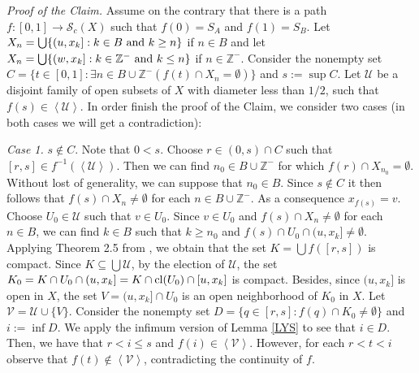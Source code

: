 \documentclass[11pt]{amsart}
\numberwithin{equation}{section}
\theoremstyle{plain}
\theoremstyle{definition}
\theoremstyle{definition}
\theoremstyle{definition}
\theoremstyle{definition}
\theoremstyle{definition}
\begin{document}
\textit{Proof of the Claim.} Assume on the contrary that there is a path $f : [0,1] \to \mathcal{S}_c(X)$ such that $f(0) = S_A$ and $f(1) = S_B$. Let $X_n = \bigcup\{(u,x_k] : k \in B \textnormal{ and } k \geq n\}$ if $n \in B$ and let $X_n = \bigcup\{(w,x_k] : k \in {\mathbb{Z}^-} \textnormal{ and } k \leq n\}$ if $n \in {\mathbb{Z}^-}$. Consider the nonempty set $C = \{t \in [0,1] : \exists n \in B \cup {\mathbb{Z}^-}(f(t) \cap X_n = \emptyset)\}$ and  $s := \sup C$. Let $\mathcal{U}$ be a disjoint family of open subsets of $X$ with diameter less than $1/2$, such that $f(s) \in \left\langle \mathcal{U}\right\rangle$. In order finish the proof of the Claim, we consider two cases (in both cases we will get a contradiction):

\smallskip

\textit{Case 1.} $s \not\in C$. Note that $0 < s$. Choose $r \in (0,s) \cap C$ such that $[r,s] \in f^{-1}(\left\langle \mathcal{U}\right\rangle)$. Then we can find $n_0 \in B \cup {\mathbb{Z}^-}$ for which  $f(r) \cap X_{n_0} = \emptyset$. Without lost of generality, we can suppose that $n_0 \in B$.  Since $s \not\in C$ it then follows  that $f(s) \cap X_n \not= \emptyset$ for each $n \in B \cup {\mathbb{Z}^-}$. As a consequence $x_{f(s)} = v$. Choose $U_0 \in \mathcal{U}$ such that $v \in U_0$. Since $v \in U_0$ and $f(s) \cap X_n \not= \emptyset$ for each $n \in B$, we can find $k \in B$ such that $k \geq n_0$ and $f(s) \cap U_0 \cap (u,x_k] \not= \emptyset$. Applying Theorem 2.5 from \cite{emi}, we obtain that the set $K = \bigcup f([r,s])$ is compact. Since $K \subseteq \bigcup \mathcal{U}$, by the election of $\mathcal{U}$, the set $K_0 = K \cap U_0 \cap (u,x_k] = K \cap \textnormal{cl}(U_0) \cap [u,x_k]$ is compact. Besides, since $(u,x_k]$ is open in $X$, the set $V = (u,x_k] \cap U_0$ is an open neighborhood of $K_0$ in $X$. Let $\mathcal{V} = \mathcal{U} \cup \{V\}$. Consider the nonempty set $D = \{q \in [r,s] : f(q) \cap K_0 \not= \emptyset\}$ and  $i := \inf D$. We apply the infimum version of Lemma \ref{LYS} to see that $i \in D$. Then,  we have that $r < i \leq s$ and $f(i) \in \left\langle \mathcal{V} \right\rangle$. However, for each $r < t < i$ observe that $f(t) \not \in \left\langle \mathcal{V} \right\rangle$, contradicting the continuity of $f$.

\smallskip
\end{document}
